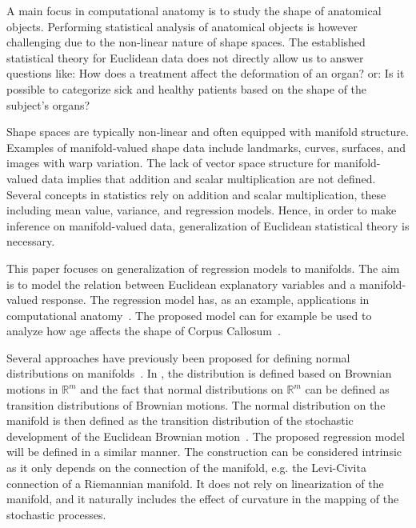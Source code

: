 \documentclass[runningheads,a4paper]{llncs}
\newcommand{\R}{\mathbb R}
\begin{document}
A main focus in computational anatomy is to study the shape of anatomical objects. Performing statistical analysis of anatomical objects is however challenging due to the non-linear nature of shape spaces. The established statistical theory for Euclidean data does not directly allow us to answer questions like: How does a treatment affect the deformation of an organ? or: Is it possible to categorize sick and healthy patients based on the shape of the subject's organs?

Shape spaces are typically non-linear and often equipped with manifold structure. Examples of manifold-valued shape data include landmarks, curves, surfaces, and images with warp variation. The lack of vector space structure for manifold-valued data implies that addition and scalar multiplication are not defined. Several concepts in statistics rely on addition and scalar multiplication, these including mean value, variance, and regression models. Hence, in order to make inference on manifold-valued data, generalization of Euclidean statistical theory is necessary. 

This paper focuses on generalization of regression models to manifolds. The aim is to model the relation between Euclidean explanatory variables and a manifold-valued response. The regression model has, as an example, applications in computational anatomy~\cite{younes_evolutions_2009}. The proposed model can for example be used to analyze how age affects the shape of Corpus Callosum~\cite{geoReg}.

Several approaches have previously been proposed for defining normal distributions on manifolds~\cite{pennec_intrinsic_2006,sommer_anisotropic}. In \cite{sommer_anisotropic}, the distribution is defined based on Brownian motions in $\R^m$ and the fact that normal distributions on $\R^m$ can be defined as transition distributions of Brownian motions. The normal distribution on the manifold is then defined as the transition distribution of the stochastic development of the Euclidean Brownian motion~\cite{hsu_stocAnMan}. The proposed regression model will be defined in a similar manner. The construction can be considered intrinsic as it only depends on the connection of the manifold, e.g. the Levi-Civita connection of a Riemannian manifold. It does not rely on linearization of the manifold, and it naturally includes the effect of curvature in the mapping of the stochastic processes.
\end{document}
